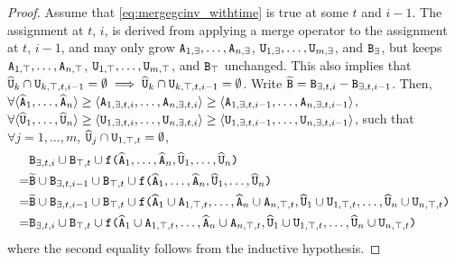\begin{proof}
Assume that \eqref{eq:mergegcinv_withtime} is true at some $t$ and $i-1$.
The assignment at $t$, $i$, is derived from applying a merge operator to the assignment at $t$, $i-1$, and may only grow $\tt{A}_{1,\exists}, \dots, \tt{A}_{n,\exists}$, $\tt{U}_{1,\exists}, \dots, \tt{U}_{m,\exists}$, and $\tt{B}_\exists$,
but keeps $\tt{A}_{1,\top}, \dots, \tt{A}_{n,\top}$, $\tt{U}_{1,\top}, \dots, \tt{U}_{m,\top}$, and $\tt{B}_\top$ unchanged.
This also implies that $\widehat{\tt{U}}_k \cap \tt{U}_{k,\top,t,i-1} = \emptyset \implies \widehat{\tt{U}}_k \cap \tt{U}_{k,\top,t,i-1} = \emptyset$.
Write $\widetilde{\tt{B}} = \tt{B}_{\exists,t,i} - \tt{B}_{\exists,t,i-1}$.
Then, $\forall \langle \widehat{\tt{A}}_1, \dots, \widehat{\tt{A}}_n\rangle \geq \langle \tt{A}_{1,\exists,t,i},\dots,\tt{A}_{n,\exists,t,i} \rangle \geq \langle \tt{A}_{1,\exists,t,i-1},\dots,\tt{A}_{n,\exists,t,i-1} \rangle$,
$\forall \langle \widehat{\tt{U}}_1, \dots, \widehat{\tt{U}}_n\rangle \geq \langle \tt{U}_{1,\exists,t,i},\dots,\tt{U}_{n,\exists,t,i} \rangle \geq \langle \tt{U}_{1,\exists,t,i-1},\dots,\tt{U}_{n,\exists,t,i-1} \rangle$,
such that
$\forall j=1,\dots,m$, $\widehat{\tt{U}}_j \cap \tt{U}_{1,\top,t} = \emptyset$,
\begin{align*}
&\tt{B}_{\exists,t,i} \cup \tt{B}_{\top,t}
\cup
\tt{f(}
  \widehat{\tt{A}}_1,
    \dots,
    \widehat{\tt{A}}_n,
  \widehat{\tt{U}}_1,
    \dots,
    \widehat{\tt{U}}_n
\tt{)}\\
=&
\widetilde{\tt{B}} \cup \tt{B}_{\exists,t,i-1} \cup \tt{B}_{\top,t}
\cup
\tt{f(}
  \widehat{\tt{A}}_1,
    \dots,
    \widehat{\tt{A}}_n,
  \widehat{\tt{U}}_1,
    \dots,
    \widehat{\tt{U}}_n
\tt{)}\\
=&
\widetilde{\tt{B}} \cup \tt{B}_{\exists,t,i-1} \cup \tt{B}_{\top,t}
\cup
\tt{f(}
  \widehat{\tt{A}}_1 \cup \tt{A}_{1,\top,t},
  \dots,
  \widehat{\tt{A}}_n \cup \tt{A}_{n,\top,t},
  \widehat{\tt{U}}_1 \cup \tt{U}_{1,\top,t},
  \dots,
  \widehat{\tt{U}}_n \cup \tt{U}_{n,\top,t}
\tt{)}\\
=&
\tt{B}_{\exists,t,i} \cup \tt{B}_{\top,t}
\cup
\tt{f(}
  \widehat{\tt{A}}_1 \cup \tt{A}_{1,\top,t},
  \dots,
  \widehat{\tt{A}}_n \cup \tt{A}_{n,\top,t},
  \widehat{\tt{U}}_1 \cup \tt{U}_{1,\top,t},
  \dots,
  \widehat{\tt{U}}_n \cup \tt{U}_{n,\top,t}
\tt{)}
\end{align*}
where the second equality follows from the inductive hypothesis.


\end{proof}
